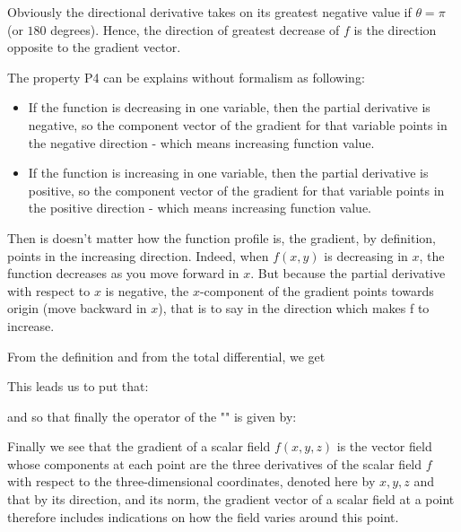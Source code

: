 	Obviously the directional derivative takes on its greatest negative value if $\theta=\pi$ (or $180$ degrees). Hence, the direction of greatest decrease of $f$ is the direction opposite to the gradient vector.

	The property P4 can be explains without formalism as following:
	\begin{itemize}
		\item If the function is decreasing in one variable, then the partial derivative is negative, so the component vector of the gradient for that variable points in the negative direction - which means increasing function value.

		\item If the function is increasing in one variable, then the partial derivative is positive, so the component vector of the gradient for that variable points in the positive direction - which means increasing function value.
	\end{itemize}
	Then is doesn't matter how the function profile is, the gradient, by definition, points in the increasing direction. Indeed, when 	
$f(x,y)$ is decreasing in $x$, the function decreases as you move forward in $x$. But because the partial derivative with respect to $x$ is negative, the $x$-component of the gradient points towards origin (move backward in $x$), that is to say in the direction which makes f to increase.
	
	From the definition and from the total differential, we get
	
	This leads us to put that:
	
	and so that finally the operator of the "" is given by:
	
	Finally we see that the gradient of a scalar field $f(x,y,z)$ is the vector field whose components at each point are the three derivatives of the scalar field $f$ with respect to the three-dimensional coordinates, denoted here by $x, y, z$ and that by its direction, and its norm, the gradient vector of a scalar field at a point therefore includes indications on how the field varies around this point.
	
